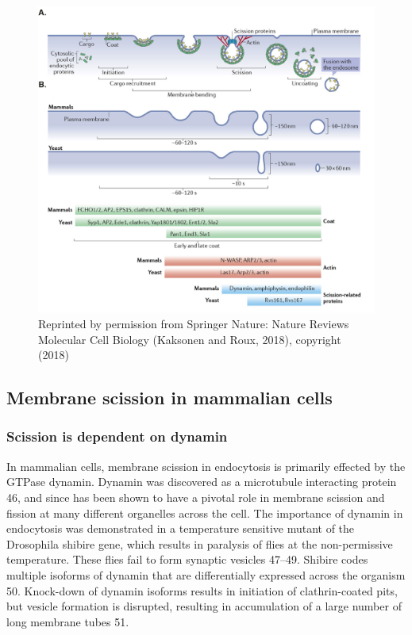 \begin{figure}[H]
	\centering
	\includegraphics[scale=0.6]{figures/intro/Fig2_kaksonen}
\caption[Endocytic pathway in mammalian and yeast cells]
{Reprinted by permission from Springer Nature: Nature Reviews Molecular Cell Biology (Kaksonen and Roux, 2018), copyright (2018)}
\end{figure}
		
\subsection{Membrane scission in mammalian cells}
		\subsubsection{Scission is dependent on dynamin} 
		In mammalian cells, membrane scission in endocytosis is primarily effected by the GTPase dynamin. Dynamin was discovered as a microtubule interacting protein 46, and since has been shown to have a pivotal role in membrane scission and fission at many different organelles across the cell. The importance of dynamin in endocytosis was demonstrated in a temperature sensitive mutant of the Drosophila shibire gene, which results in paralysis of flies at the non-permissive temperature. These flies fail to form synaptic vesicles 47–49. Shibire codes multiple isoforms of dynamin that are differentially expressed across the organism 50. Knock-down of dynamin isoforms results in initiation of clathrin-coated pits, but vesicle formation is disrupted, resulting in accumulation of a large number of long membrane tubes 51. 

